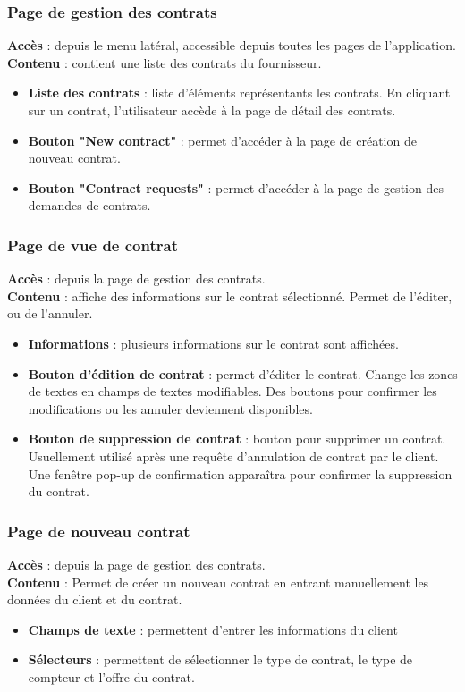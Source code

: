 \documentclass[../rapport.tex]{subfiles}
\begin{document}
\subsubsection{Page de gestion des contrats}
\noindent \textbf{Accès} :  depuis le menu latéral, accessible depuis toutes les pages de l'application.\\
\textbf{Contenu }: contient une liste des contrats du fournisseur. 
\begin{itemize}
    \item \textbf{Liste des contrats} : liste d'éléments représentants les contrats. En cliquant sur un contrat, l'utilisateur accède à la page de détail des contrats.
    \item \textbf{Bouton "New contract"} : permet d'accéder à la page de création de nouveau contrat.
    \item \textbf{Bouton "Contract requests"} : permet d'accéder à la page de gestion des demandes de contrats.
\end{itemize}


\subsubsection{Page de vue de contrat}
\noindent \textbf{Accès} : depuis la page de gestion des contrats. \\
\textbf{Contenu }: affiche des informations sur le contrat sélectionné. Permet de l'éditer, ou de l'annuler.
\begin{itemize} 
    \item \textbf{Informations} : plusieurs informations sur le contrat sont affichées.
    \item \textbf{Bouton d'édition de contrat} : permet d'éditer le contrat. Change les zones de textes en champs de textes modifiables. Des boutons pour confirmer les modifications ou les annuler deviennent disponibles.
    \item \textbf{Bouton de suppression de contrat} : bouton pour supprimer un contrat. Usuellement utilisé après une requête d'annulation de contrat par le client. Une fenêtre pop-up de confirmation apparaîtra pour confirmer la suppression du contrat.
\end{itemize}

\subsubsection{Page de nouveau contrat}
\noindent \textbf{Accès} :  depuis la page de gestion des contrats.\\
\textbf{Contenu }: Permet de créer un nouveau contrat en entrant manuellement les données du client et du contrat.  
\begin{itemize}
    \item \textbf{Champs de texte} : permettent d'entrer les informations du client
    \item \textbf{Sélecteurs} : permettent de sélectionner le type de contrat, le type de compteur et l'offre du contrat.
\end{itemize}
\end{document}
